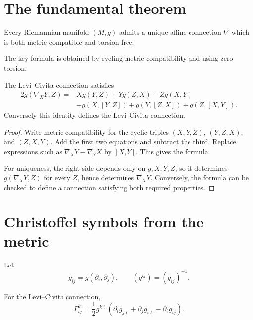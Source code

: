 \section{The fundamental theorem}

\begin{theorem}\label{thm:vii22-fundamental}
Every Riemannian manifold \((M,g)\) admits a unique affine connection \(\nabla\)
which is both metric compatible and torsion free.
\end{theorem}

The key formula is obtained by cycling metric compatibility and using zero torsion.

\begin{theorem}\label{thm:vii22-koszul}
The Levi--Civita connection satisfies
\[
\begin{aligned}
2g(\nabla_XY,Z)
={}&Xg(Y,Z)+Yg(Z,X)-Zg(X,Y)\\
&-g(X,[Y,Z])+g(Y,[Z,X])+g(Z,[X,Y]).
\end{aligned}
\]
Conversely this identity defines the Levi--Civita connection.
\end{theorem}

\begin{proof}
Write metric compatibility for the cyclic triples
\((X,Y,Z)\), \((Y,Z,X)\), and \((Z,X,Y)\). Add the first two equations and subtract
the third. Replace expressions such as \(\nabla_XY-\nabla_YX\) by \([X,Y]\).
This gives the formula.

For uniqueness, the right side depends only on \(g,X,Y,Z\), so it determines
\(g(\nabla_XY,Z)\) for every \(Z\), hence determines \(\nabla_XY\).  Conversely,
the formula can be checked to define a connection satisfying both required
properties.
\end{proof}

\section{Christoffel symbols from the metric}

Let
\[
g_{ij}=g(\partial_i,\partial_j),
\qquad
(g^{ij})=(g_{ij})^{-1}.
\]

\begin{theorem}\label{thm:vii22-christoffel}
For the Levi--Civita connection,
\[
\Gamma^k_{ij}
=
\frac12 g^{k\ell}
\left(
\partial_i g_{j\ell}
+\partial_j g_{i\ell}
-\partial_\ell g_{ij}
\right).
\]
\end{theorem}

